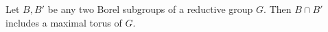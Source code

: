 Let $B, B'$ be any two Borel subgroups of a reductive group $G$. Then $B \cap B'$ includes a maximal torus of $G$.
